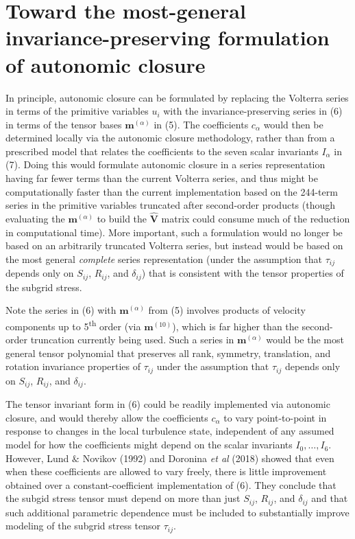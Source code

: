 \section{Toward the most-general invariance-preserving formulation of autonomic closure} 

In principle, autonomic closure can be formulated by replacing the Volterra series in terms of the primitive variables $u_i$  with the invariance-preserving series in (6) in terms of the tensor bases $\mathbf{m}^{(\alpha)}$  in (5). The coefficients $c_{\alpha}$  would then be determined locally via the autonomic closure methodology, rather than from a prescribed model that relates the coefficients to the seven scalar invariants $I_{\alpha}$ in (7). Doing this would formulate autonomic closure in a series representation having far fewer terms than the current Volterra series, and thus might be computationally faster than the current implementation based on the 244-term series in the primitive variables truncated after second-order products (though evaluating the  $\mathbf{m}^{(\alpha)}$  to build the $\mathbf{\widehat{V}}$  matrix could consume much of the reduction in computational time). More important, such a formulation would no longer be based on an arbitrarily truncated Volterra series, but instead would be based on the most general \textit{complete} series representation (under the assumption that $\tau_{ij}$  depends only on $S_{ij}$, $R_{ij}$, and $\delta_{ij}$) that is consistent with the tensor properties of the subgrid stress. 

Note the series in (6) with  $\mathbf{m}^{(\alpha)}$ from (5) involves products of velocity components up to 5\textsuperscript{th} order (via $\mathbf{m}^{(10)}$), which is far higher than the second-order truncation currently being used. Such a series in  $\mathbf{m}^{(\alpha)}$ would be the most general tensor polynomial that preserves all rank, symmetry, translation, and rotation invariance properties of  $\tau_{ij}$ under the assumption that  $\tau_{ij}$ depends only on $S_{ij}$, $R_{ij}$, and $\delta_{ij}$.

The tensor invariant form in (6) could be readily implemented via autonomic closure, and would thereby allow the coefficients $c_{\alpha}$  to vary point-to-point in response to changes in the local turbulence state, independent of any assumed model for how the coefficients might depend on the scalar invariants $I_0,\ldots,I_6$. However, Lund $\&$ Novikov (1992) and Doronina \textit{et al} (2018) showed that even when these coefficients are allowed to vary freely, there is little improvement obtained over a constant-coefficient implementation of (6). They conclude that the subgid stress tensor must depend on more than just $S_{ij}$, $R_{ij}$, and $\delta_{ij}$ and that such additional parametric dependence must be included to substantially improve modeling of the subgrid stress tensor $\tau_{ij}$.

